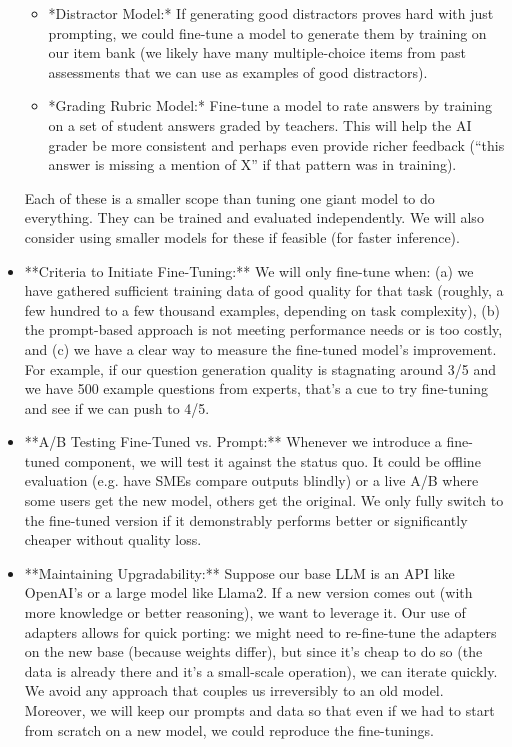 \documentclass[11pt]{article}
\begin{document}
\begin{itemize}
\begin{itemize}
      \item *Distractor Model:* If generating good distractors proves hard with just prompting, we could fine-tune a model to generate them by training on our item bank (we likely have many multiple-choice items from past assessments that we can use as examples of good distractors).
      \item *Grading Rubric Model:* Fine-tune a model to rate answers by training on a set of student answers graded by teachers. This will help the AI grader be more consistent and perhaps even provide richer feedback (“this answer is missing a mention of X” if that pattern was in training).
    \end{itemize}
    Each of these is a smaller scope than tuning one giant model to do everything. They can be trained and evaluated independently. We will also consider using smaller models for these if feasible (for faster inference).
  \item **Criteria to Initiate Fine-Tuning:** We will only fine-tune when: (a) we have gathered sufficient training data of good quality for that task (roughly, a few hundred to a few thousand examples, depending on task complexity), (b) the prompt-based approach is not meeting performance needs or is too costly, and (c) we have a clear way to measure the fine-tuned model’s improvement. For example, if our question generation quality is stagnating around 3/5 and we have 500 example questions from experts, that’s a cue to try fine-tuning and see if we can push to 4/5.
  \item **A/B Testing Fine-Tuned vs. Prompt:** Whenever we introduce a fine-tuned component, we will test it against the status quo. It could be offline evaluation (e.g. have SMEs compare outputs blindly) or a live A/B where some users get the new model, others get the original. We only fully switch to the fine-tuned version if it demonstrably performs better or significantly cheaper without quality loss.
  \item **Maintaining Upgradability:** Suppose our base LLM is an API like OpenAI’s or a large model like Llama2. If a new version comes out (with more knowledge or better reasoning), we want to leverage it. Our use of adapters allows for quick porting: we might need to re-fine-tune the adapters on the new base (because weights differ), but since it’s cheap to do so (the data is already there and it’s a small-scale operation), we can iterate quickly. We avoid any approach that couples us irreversibly to an old model. Moreover, we will keep our prompts and data so that even if we had to start from scratch on a new model, we could reproduce the fine-tunings.

\end{itemize}
\end{document}
